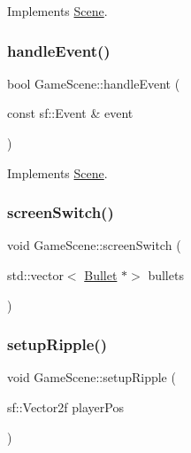 Implements \hyperlink{class_scene_a789c16961aa1e316b2a4a05b95187546}{Scene}.

\mbox{\label{class_game_scene_aa494372b1f451f3c3a268558fddb30f2}} 
\subsubsection{\texorpdfstring{handle\+Event()}{handleEvent()}}
{\footnotesize\ttfamily bool Game\+Scene\+::handle\+Event (\begin{DoxyParamCaption}\item[{const sf\+::\+Event \&}]{event }\end{DoxyParamCaption})\hspace{0.3cm}{\ttfamily [virtual]}}



Implements \hyperlink{class_scene_af25e4d2c998aca4e95899fb67488e815}{Scene}.

\mbox{\label{class_game_scene_a030583d6469d9f44fda3fc5777c46a08}} 
\subsubsection{\texorpdfstring{screen\+Switch()}{screenSwitch()}}
{\footnotesize\ttfamily void Game\+Scene\+::screen\+Switch (\begin{DoxyParamCaption}\item[{std\+::vector$<$ \hyperlink{class_bullet}{Bullet} $\ast$$>$}]{bullets }\end{DoxyParamCaption})}

\mbox{\label{class_game_scene_aca0b30f731595929fb7182e2f65941b1}} 
\subsubsection{\texorpdfstring{setup\+Ripple()}{setupRipple()}}
{\footnotesize\ttfamily void Game\+Scene\+::setup\+Ripple (\begin{DoxyParamCaption}\item[{sf\+::\+Vector2f}]{player\+Pos }\end{DoxyParamCaption})}

